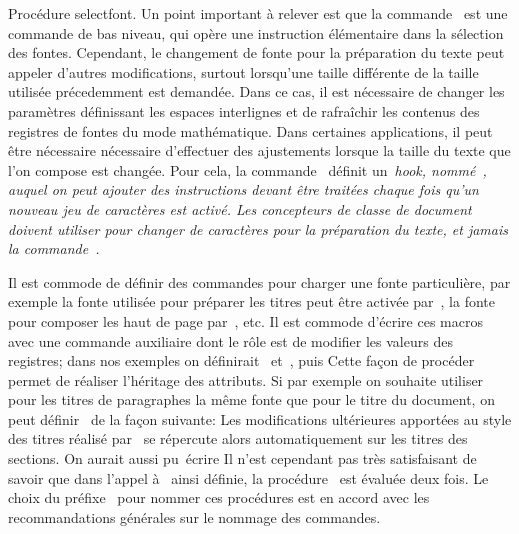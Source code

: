 \formalpar Procédure selectfont.
Un point important à relever est que la commande~ est
une commande de bas niveau, qui opère une instruction élémentaire dans
la sélection des fontes.  Cependant, le changement de fonte pour la
préparation du texte peut appeler d'autres modifications, surtout
lorsqu'une taille différente de la taille utilisée précedemment est
demandée. Dans ce cas, il est nécessaire de changer les paramètres
définissant les espaces interlignes et de rafraîchir les contenus des
registres de fontes du mode mathématique. Dans certaines applications,
il peut être nécessaire nécessaire d'effectuer des ajustements lorsque
la taille du texte que l'on compose est changée. Pour cela, la
commande~ définit un~\em{hook},
nommé~, auquel on peut ajouter des instructions
devant être traitées chaque fois qu'un nouveau jeu de caractères est
activé. Les concepteurs de classe de document doivent utiliser
 pour changer de caractères pour la préparation du
texte, et jamais la commande~.

Il est commode de définir des commandes pour charger une fonte
particulière, par exemple la fonte utilisée pour préparer les titres
peut être activée par~, la fonte pour composer les haut
de page par~, etc. Il est commode d'écrire ces
macros avec une commande auxiliaire dont le rôle est de modifier les
valeurs des registres; dans nos exemples on
définirait~ et~, puis
\beginverbatim
\def\titlefont{\settitlefont\selectfont}
\def\runningheaderfont{\setrunningheaderfont\selectfont}
\endverbatim
Cette façon de procéder permet de réaliser l'héritage des
attributs. Si par exemple on souhaite utiliser pour les titres de
paragraphes la même fonte que pour le titre du document, on peut
définir~ de la façon suivante:
\beginverbatim
\def\setsectiontitlefont{\settitlefont\setfontsize{12}}
\def\sectiontitlefont{\setsectiontitlefont\selectfont}
\endverbatim
Les modifications ultérieures apportées au style des titres réalisé
par~ se répercute alors automatiquement sur les
titres des sections. On aurait aussi pu~écrire
\beginverbatim
\def\sectiontitlefont{\titlefont\setfontsize{12}\selectfont}
\endverbatim
Il n'est cependant pas très satisfaisant de savoir que dans l'appel
à~ ainsi définie, la procédure~
est évaluée deux fois. Le choix du préfixe~ pour nommer ces
procédures est en accord avec les recommandations générales sur le
nommage des commandes.

